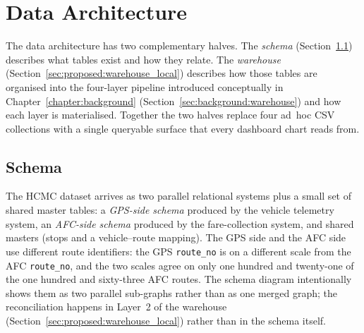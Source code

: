 \section{Data Architecture}
\label{sec:proposed:dataarch}

The data architecture has two complementary halves. The
\emph{schema} (Section~\ref{sec:proposed:schema}) describes what
tables exist and how they relate. The \emph{warehouse}
(Section~\ref{sec:proposed:warehouse_local}) describes how those
tables are organised into the four-layer pipeline introduced
conceptually in Chapter~\ref{chapter:background}
(Section~\ref{sec:background:warehouse}) and how each layer is
materialised. Together the two halves replace four ad~hoc CSV
collections with a single queryable surface that every dashboard
chart reads from.

\subsection{Schema}
\label{sec:proposed:schema}

The HCMC dataset arrives as two parallel relational systems
plus a small set of shared master tables: a \emph{GPS-side
schema} produced by the vehicle telemetry system, an
\emph{AFC-side schema} produced by the fare-collection system,
and shared masters (stops and a vehicle--route mapping). The
GPS side and the AFC side use different route identifiers: the
GPS \texttt{route\_no} is on a different scale from the AFC
\texttt{route\_no}, and the two scales agree on only one
hundred and twenty-one of the one hundred and sixty-three AFC
routes. The schema diagram intentionally shows them as two
parallel sub-graphs rather than as one merged graph; the
reconciliation happens in Layer~2 of the warehouse
(Section~\ref{sec:proposed:warehouse_local}) rather than in the
schema itself.

